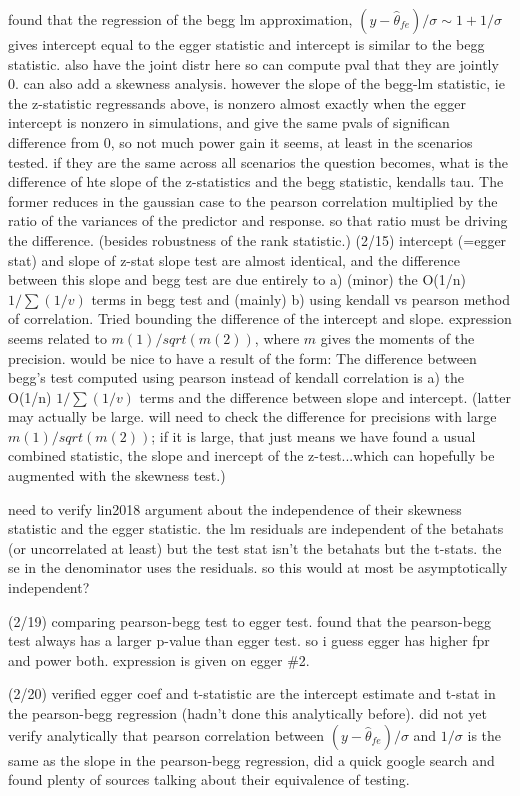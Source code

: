 \documentclass{article}
\begin{document}
found that the regression of the begg lm approximation,
$(y-\hat\theta_{fe})/\sigma \sim 1 + 1/\sigma$ gives intercept equal
to the egger statistic and intercept is similar to the begg
statistic. also have the joint distr here so can compute pval that
they are jointly 0. can also add a skewness analysis. however the
slope of the begg-lm statistic, ie the z-statistic regressands above,
is nonzero almost exactly when the egger intercept is nonzero in
simulations, and give the same pvals of significan difference from 0,
so not much power gain it seems, at least in the scenarios tested. if
they are the same across all scenarios the question becomes, what is
the difference of hte slope of the z-statistics and the begg
statistic, kendalls tau. The former reduces in the gaussian case to
the pearson correlation multiplied by the ratio of the variances of
the predictor and response. so that ratio must be driving the
difference. (besides robustness of the rank statistic.)  (2/15)
intercept (=egger stat) and slope of z-stat slope test are almost
identical, and the difference between this slope and begg test are due
entirely to a) (minor) the O(1/n) $1/\sum(1/v)$ terms in begg test and
(mainly) b) using kendall vs pearson method of correlation. Tried
bounding the difference of the intercept and slope. expression seems
related to $m(1)/sqrt(m(2))$, where $m$ gives the moments of the
precision. would be nice to have a result of the form: The difference
between begg's test computed using pearson instead of kendall
correlation is a) the O(1/n) $1/\sum(1/v)$ terms and the difference
between slope and intercept. (latter may actually be large. will need
to check the difference for precisions with large $m(1)/sqrt(m(2))$;
if it is large, that just means we have found a usual combined
statistic, the slope and inercept of the z-test...which can hopefully
be augmented with the skewness test.)


need to verify lin2018 argument about the independence of their
skewness statistic and the egger statistic. the lm residuals are
independent of the betahats (or uncorrelated at least) but the test
stat isn't the betahats but the t-stats. the se in the denominator
uses the residuals. so this would at most be asymptotically
independent?


(2/19) comparing pearson-begg test to egger test. found that the
pearson-begg test always has a larger p-value than egger test. so i
guess egger has higher fpr and power both. expression is given on
egger \#2.

(2/20) verified egger coef and t-statistic are the intercept estimate
and t-stat in the pearson-begg regression (hadn't done this
analytically before). did not yet verify analytically that pearson
correlation between $(y-\hat\theta_{fe})/\sigma$ and $1/\sigma$ is the
same as the slope in the pearson-begg regression, did a quick google
search and found plenty of sources talking about their equivalence of
testing.
\end{document}

